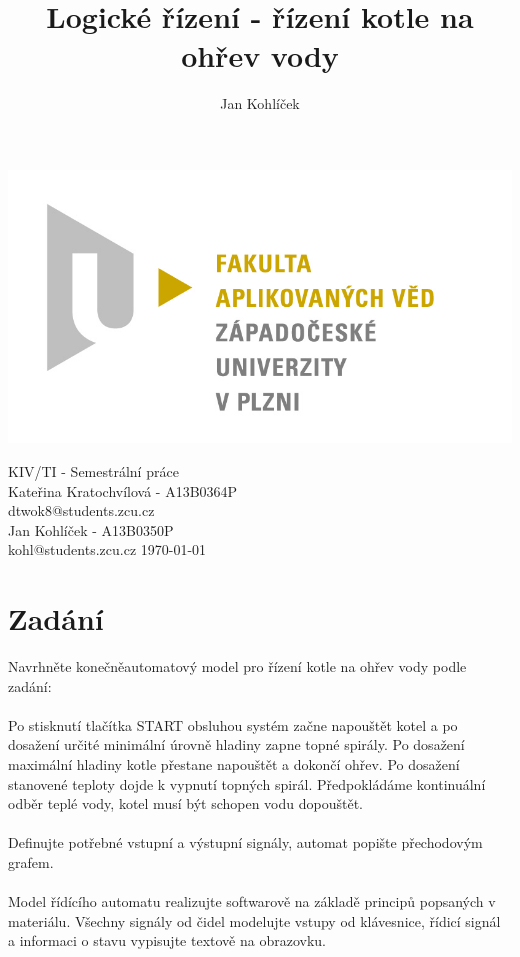 \documentclass[12pt]{report}
\title{Logické řízení - řízení kotle na ohřev vody}
\author{Jan Kohlíček}
\begin{document}
\begin{titlepage}
\begin{flushleft} 
{\includegraphics[width=.5\textwidth]{./images/fav_logo.jpg}\\[3cm]}
\end{flushleft}
\begin{center}

{\Huge KIV/TI - Semestrální práce}
\\[0.3cm]
\vspace{1.7cm}
{\Large Kateřina Kratochvílová - A13B0364P}\\
\vspace{0.2cm}
{\normalsize dtwok8@students.zcu.cz}\\
\vspace{1cm}
{\Large Jan Kohlíček - A13B0350P}\\
\vspace{0.2cm}
{\normalsize kohl@students.zcu.cz }
\vfill
{\large \today}
\end{center}
\end{titlepage}

\tableofcontents
\thispagestyle{empty}



\chapter{Zadání}
\setcounter{page}{1}
Navrhněte konečněautomatový model pro řízení kotle na ohřev vody podle zadání:\\
\\
Po stisknutí tlačítka START obsluhou systém začne napouštět kotel a po dosažení určité minimální úrovně hladiny zapne topné spirály. Po dosažení maximální hladiny kotle přestane napouštět a dokončí ohřev. Po dosažení stanovené teploty dojde k vypnutí topných spirál. Předpokládáme kontinuální odběr teplé vody, kotel musí být schopen vodu dopouštět.\\
\\
Definujte potřebné vstupní a výstupní signály, automat popište přechodovým grafem.\\
\\
Model řídícího automatu realizujte softwarově na základě principů popsaných v materiálu. Všechny signály od čidel modelujte vstupy od klávesnice, řídicí signál a informaci o stavu vypisujte textově na obrazovku.\\
\end{document}
